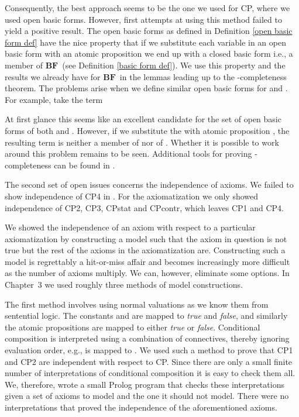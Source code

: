 \documentclass[a4paper,twoside,openright]{report}
\newcommand{\BF}{\ensuremath{\textbf{BF}}}
\begin{document}
Consequently, the best approach seems to be the one we used for CP, where we used open basic forms. However, first attempts at using this method failed to yield a positive result. The open basic forms as defined in Definition \ref{open basic form def} have the nice property that if we substitute each variable in an open basic form with an atomic proposition we end up with a closed basic form i.e., a member of \BF\ (see Definition \ref{basic form def}). We use this property and the results we already have for \BF\ in the lemmas leading up to the -completeness theorem. The problems arise when we define similar open basic forms for  and . For example, take the term

At first glance this seems like an excellent candidate for the set of open basic forms of both  and . However, if we substitute the  with atomic proposition , the resulting term is neither a member of  nor of . Whether it is possible to work around this problem remains to be seen. Additional tools for proving -completeness can be found in \cite{omega}.

The second set of open issues concerns the independence of axioms. We failed to show independence of CP4 in . For the axiomatization  we only showed independence of CP2, CP3, CPstat and CPcontr, which leaves CP1 and CP4.

We showed the independence of an axiom with respect to a particular axiomatization by constructing a model such that the axiom in question is not true but the rest of the axioms in the axiomatization are. Constructing such a model is regrettably a hit-or-miss affair and becomes increasingly more difficult as the number of axioms multiply. We can, however, eliminate some options. In Chapter~3 we used roughly three methods of model constructions. 

The first method involves using normal valuations as we know them from sentential logic. The constants  and  are mapped to \emph{true} and \emph{false}, and similarly the atomic propositions are mapped to either \emph{true} or \emph{false}. Conditional composition is interpreted using a combination of connectives, thereby ignoring evaluation order, e.g.,  is mapped to . We used such a method to prove that CP1 and CP2 are independent with respect to CP. Since there are only a small finite number of interpretations of conditional composition it is easy to check them all. We, therefore, wrote a small Prolog program that checks these interpretations given a set of axioms to model and the one it should not model. There were no interpretations that proved the independence of the aforementioned axioms.
\end{document}
